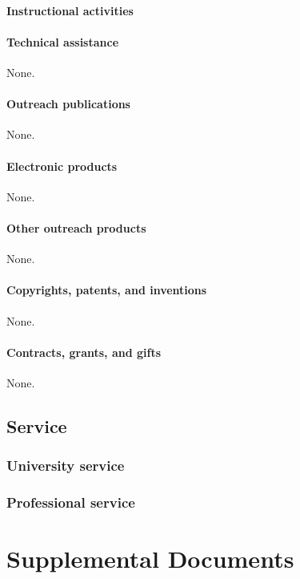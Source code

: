 \paragraph{Instructional activities}


\paragraph{Technical assistance}
None.

\paragraph{Outreach publications}
None.

\paragraph{Electronic products}
None.

\paragraph{Other outreach products}
None.

\paragraph{Copyrights, patents, and inventions}
None.

\paragraph{Contracts, grants, and gifts}
None.

\subsection{Service}

\subsubsection{University service}


\subsubsection{Professional service}


\newpage

\section{Supplemental Documents}






